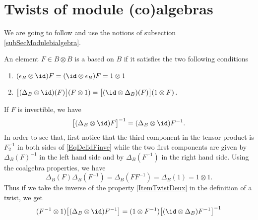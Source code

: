 
\section{Twists of module (co)algebras}
\label{SecTheoryTwist}

We are going to follow \cite{GiaquintoZhangTwist} and use the notions of subsection \ref{subSecModulebialgebra}. 
\begin{definition}	\label{DefTwist}
	An element $F\in B\otimes B$ is a  based on $B$ if it satisfies the two following conditions
	\begin{enumerate}

		\item\label{ItemTwistUn}
			$(\epsilon_B\otimes \id)F=(\id\otimes \epsilon_B)F=1\otimes 1$
		\item\label{ItemTwistDeux}
			$\big[ (\Delta_B\otimes\id)(F) \big](F\otimes 1)=\big[ (\id\otimes\Delta_B)(F) \big](1\otimes F)$.
	
	\end{enumerate}
\end{definition}
If $F$ is invertible, we have
\begin{equation}		\label{EqDelidFinve}
	\big[ (\Delta_B\otimes\id)F\big]^{-1}=(\Delta_B\otimes\id)F^{-1}.
\end{equation}
In order to see that, first notice that the third component in the tensor product is $F_2^{-1}$ in both sides of \eqref{EqDelidFinve} while the two first components are given by $\Delta_B(F)^{-1}$ in the left hand side and by $\Delta_B(F^{-1})$ in the right hand side. Using the coalgebra properties, we have
\begin{equation}
	\Delta_B(F)\Delta_B(F^{-1})=\Delta_B(FF^{-1})=\Delta_B(1)=1\otimes 1.
\end{equation}
Thus if we take the inverse of the property \ref{ItemTwistDeux} in the definition of a twist, we get
\begin{equation}		\label{EqFemuVaLeLem}
	(F^{-1}\otimes 1)\big[ (\Delta_B\otimes\id)F^{-1} \big]=(1\otimes F^{-1})\big[ (\id\otimes\Delta_B)F^{-1} \big]^{-1}
\end{equation}

